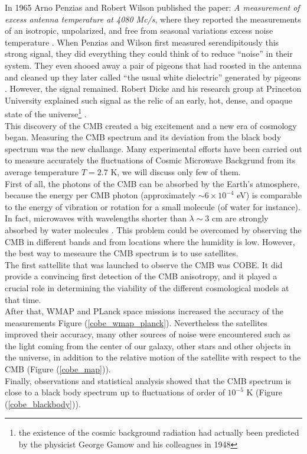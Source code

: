\documentclass{article}
\begin{document}
In 1965 Arno Penzias and Robert Wilson published the paper: \emph{A measurement of excess antenna temperature at
4080 Mc/s}, where they reported the measurements of an isotropic, unpolarized, and free from seasonal variations excess noise temperature
\citep{penziasMeasurementExcessAntenna1965}. 
When Penzias and Wilson first measured serendipitously this strong signal, they did everything they could think of to reduce “noise” in their system. 
They even shooed away a pair of pigeons that had roosted in the antenna and cleaned up they later called “the usual white dielectric” generated by pigeons \citep{RydenIntroCosmoPdf}.
However, the signal remained. 
Robert Dicke and his research group at Princeton University explained such signal as the relic of an early, hot, dense, and opaque state of the universe\footnote{the existence of the cosmic background radiation had actually been predicted by the physicist George Gamow and his colleagues in 1948} \citep{bucherPhysicsCosmicMicrowave2015}
. \\
This discovery of the CMB created a big excitement and a new era of cosmology began.
Measuring the CMB spectrum and its deviation from the black body spectrum was the new challange.
Many experimental efforts have been carried out to measure accurately the fluctuations of Cosmic Microwave Backgrund from its average temperature $T = 2.7$ K, we will discuss only few of them.
\\
First of all, the photons of the CMB can be absorbed by the Earth's atmosphere, because the energy per CMB photon (approximately $\sim 6 \times 10 ^{-4}$ eV) is comparable to the energy of vibration or rotation for a small molecule (of water for instance). In fact, microwaves with wavelengths shorter than $\lambda \sim 3$ cm are strongly absorbed by water molecules \citep{RydenIntroCosmoPdf}.
This problem could be overcomed by observing the CMB in different bands and from locations where the humidity is low.
However, the best way to meseaure the CMB spectrum is to use satellites.\\
The first sattellite that was launched to observe the CMB was COBE. 
It did provide a convincing first detection of the CMB anisotropy, and it played a crucial role in determining the viability of the different cosmological models at that time.
\\
After that, WMAP and PLanck space missions  increased the accuracy of the measurements Figure (\ref{cobe_wmap_planck}).
Nevertheless the satellites improved their accuracy, many other sources of noise were encountered such as the light coming from the center of our galaxy, other stars and other objects in the universe, in addition to the relative motion of the satellite with respect to the CMB (Figure (\ref{cobe_map})).\\
Finally, observations and statistical analysis showed that the CMB spectrum is close to a black body spectrum up to fluctuations of order of $10^{-5}$ K (Figure (\ref{cobe_blackbody})).\\
\end{document}
